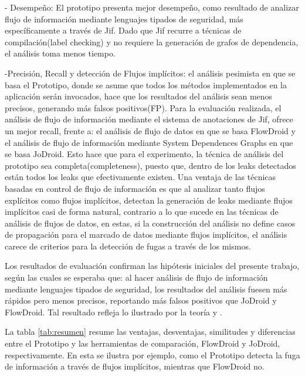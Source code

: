- Desempeño:\newline 
El prototipo presenta mejor desempeño, como resultado de analizar flujo de
información mediante lenguajes tipados de seguridad, más específicamente a
través de Jif. Dado que Jif recurre a técnicas de compilación(label checking) y
no requiere la generación de grafos de dependencia, el análisis toma menos
tiempo.

-Precisión, Recall y detección de Flujos implícitos:\newline 
el análisis pesimista en que se basa el Prototipo, donde se asume que todos los
métodos implementados en la aplicación serán invocados, hace que los resultados
del análisis sean menos precisos, generando más falsos positivos(FP). 
Para la evaluación realizada, el análisis de flujo de información mediante el
sistema de anotaciones de Jif, ofrece un mejor recall, frente a: el análisis de
flujo de datos en que se basa FlowDroid y el análisis de flujo de información
mediante System Dependences Graphs  en que se basa JoDroid. Esto hace que para
el experimento, la técnica de análisis del prototipo sea completa(completeness),
puesto que, dentro de los leaks detectados están todos los leaks que
efectivamente existen.\newline
Una ventaja de las técnicas basadas en control de flujo de información es que al
analizar tanto flujos explícitos como flujos implícitos, detectan la generación
de leaks mediante flujos implícitos casi de forma natural, contrario a lo que
sucede en las técnicas de análisis de flujos de datos, en estas, si la
construcción del análisis no define casos de propagación para el marcado de
datos mediante flujos implícitos, el análisis carece de criterios para la
detección de fugas a través de los mismos.

Los resultados de evaluación confirman las hipótesis iniciales del presente
trabajo, según las cuales se esperaba que: al hacer análisis de flujo de
información mediante lenguajes tipados de seguridad, los resultados del análisis
fuesen más rápidos pero menos precisos, reportando más falsos positivos que
JoDroid y FlowDroid.\newline
Tal resultado refleja lo ilustrado por la teoría \cite{taghdiri-etal-2010} y
\cite{hammer09ijis}.\newline

La tabla \ref{tab:resumen} resume 
las ventajas, desventajas, similitudes y
diferencias entre el Prototipo y las herramientas de comparación, FlowDroid y
JoDroid, respectivamente. En esta se ilustra por ejemplo, como el Prototipo
detecta la fuga de información a través de flujos implícitos, mientras que
FlowDroid no.

